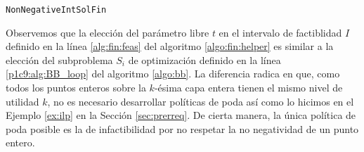 \begin{algorithm}[Ht]
	\LinesNumbered
	\caption{\texttt{NonNegativeIntSolFin}}
	\label{algo:fin:helper}
\end{algorithm}

Observemos que la elección del parámetro libre $t$ en el intervalo de factiblidad $I$ definido en la
línea \ref{alg:fin:feas} del algoritmo \ref{algo:fin:helper} es similar a la elección del
subproblema $S_i$ de optimización definido en la línea \ref{p1c9:alg:BB_loop} del algoritmo
\ref{algo:bb}. La diferencia radica en que, como todos los puntos enteros sobre la $k$-ésima capa
entera tienen el mismo nivel de utilidad $k$, no es necesario desarrollar políticas de poda así como
lo hicimos en el Ejemplo \ref{ex:ilp} en la Sección \ref{sec:prerreq}. De cierta manera, la única
política de poda posible es la de infactibilidad por no respetar la no negatividad de un punto
entero.

